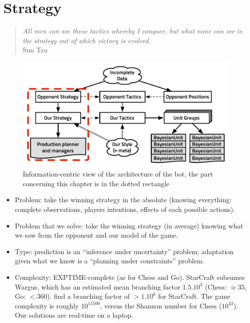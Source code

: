 \chapter{Strategy}
\chaptertoc



\begin{quotation}\textit{
All men can see these tactics whereby I conquer, but what none can see is the strategy out of which victory is evolved.}\\
Sun Tzu\end{quotation}



\begin{figure}[!ht]
\begin{center}
\includegraphics[width=13cm]{images/starcraft_bbq_concept_STRATEGY.pdf}
\end{center}
\label{fig:conceptSTRATEGY}
\caption{Information-centric view of the architecture of the bot, the part concerning this chapter is in the dotted rectangle}
\end{figure}

\begin{itemize}
\item Problem: take the winning strategy in the absolute (knowing everything: complete observations, players intentions, effects of each possible actions).
\item Problem that we solve: take the winning strategy (in average) knowing what we saw from the opponent and our model of the game. 
\item Type: prediction is an ``inference under uncertainty'' problem; adaptation given what we know is a ``planning under constraints'' problem. 
\item Complexity: EXPTIME-complete (as for Chess and Go). StarCraft subsumes Wargus, which has an estimated mean branching factor $1.5.10^3$ \citep{LTW} (Chess: $\approx 35$, Go: $<360$). \cite{bgweberPhD} find a branching factor of $> 1.10^6$ for StarCraft. The game complexity is roughly $10^11500$, versus the Shannon number for Chess ($10^43$). Our solutions are real-time on a laptop.
\end{itemize}

